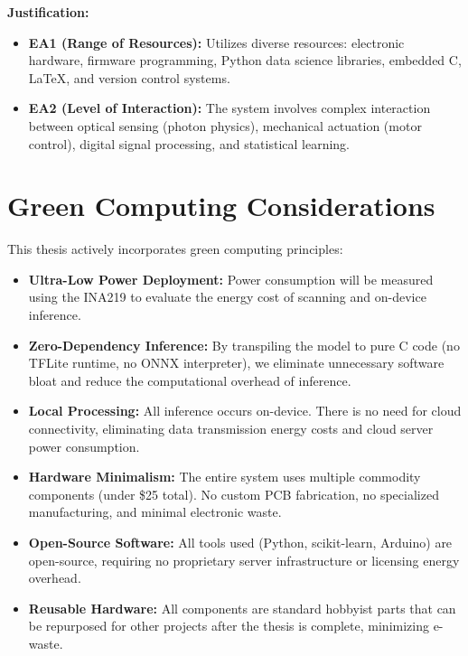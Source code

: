 \documentclass[12pt,a4paper]{article}
\begin{document}
    \textbf{Justification:}
    \begin{itemize}[leftmargin=0.35in]
        \item \textbf{EA1 (Range of Resources):} Utilizes diverse resources: electronic hardware, firmware programming, Python data science libraries, embedded C, LaTeX, and version control systems.
        \item \textbf{EA2 (Level of Interaction):} The system involves complex interaction between optical sensing (photon physics), mechanical actuation (motor control), digital signal processing, and statistical learning.
    \end{itemize}



    \section{Green Computing Considerations}

    This thesis actively incorporates green computing principles:

    \begin{itemize}[leftmargin=0.35in]
        \item \textbf{Ultra-Low Power Deployment:} Power consumption will be measured using the INA219 to evaluate the energy cost of scanning and on-device inference.

        \item \textbf{Zero-Dependency Inference:} By transpiling the model to pure C code (no TFLite runtime, no ONNX interpreter), we eliminate unnecessary software bloat and reduce the computational overhead of inference.

        \item \textbf{Local Processing:} All inference occurs on-device. There is no need for cloud connectivity, eliminating data transmission energy costs and cloud server power consumption.

        \item \textbf{Hardware Minimalism:} The entire system uses multiple commodity components (under \$25 total). No custom PCB fabrication, no specialized manufacturing, and minimal electronic waste.

        \item \textbf{Open-Source Software:} All tools used (Python, scikit-learn, Arduino) are open-source, requiring no proprietary server infrastructure or licensing energy overhead.

        \item \textbf{Reusable Hardware:} All components are standard hobbyist parts that can be repurposed for other projects after the thesis is complete, minimizing e-waste.
    \end{itemize}
\end{document}
